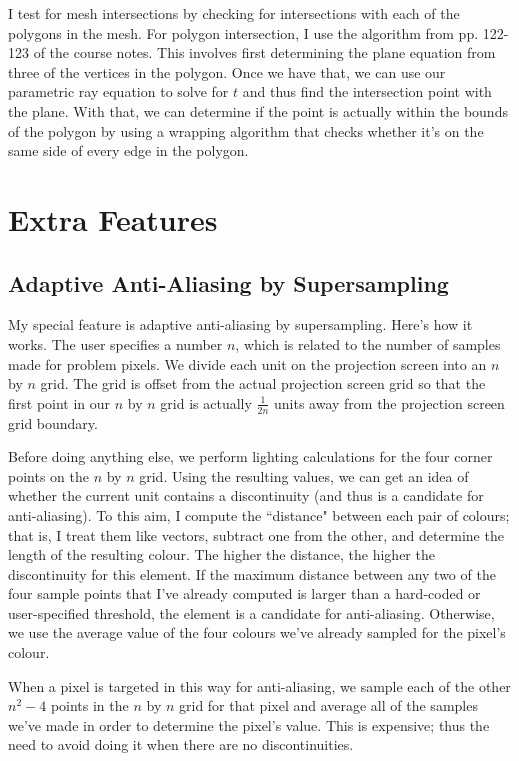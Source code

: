 \documentclass{article}
\begin{document}
I test for mesh intersections by checking for intersections with each of the
polygons in the mesh. For polygon intersection, I use the algorithm from pp. 122-123 of the
course notes. This involves first determining the plane equation from three of
the vertices in the polygon. Once we have that, we can use our parametric ray
equation to solve for $t$ and thus find the intersection point with the plane.
With that, we can determine if the point is actually within the bounds of the
polygon by using a wrapping algorithm that checks whether it's on the same side
of every edge in the polygon.

\section{Extra Features}

\subsection{Adaptive Anti-Aliasing by Supersampling}

My special feature is adaptive anti-aliasing by supersampling. Here's how it
works. The user specifies a number $n$, which is related to the number of
samples made for problem pixels. We divide each unit on the projection screen
into an $n$ by $n$ grid. The grid is offset from the actual projection screen grid so that the
first point in our $n$ by $n$ grid is actually $\frac{1}{2n}$ units away from
the projection screen grid boundary.

Before doing anything else, we perform lighting calculations for the four corner
points on the $n$ by $n$ grid. Using the resulting values, we can get an idea of
whether the current unit contains a discontinuity (and thus is a candidate for
anti-aliasing). To this aim, I compute the ``distance" between each pair of
colours; that is, I treat them like vectors, subtract one from the other, and
determine the length of the resulting colour. The higher the distance, the
higher the discontinuity for this element. If the maximum distance between any
two of the four sample points that I've already computed is larger than a
hard-coded or user-specified threshold, the element is a candidate for
anti-aliasing. Otherwise, we use the average value of the four colours we've
already sampled for the pixel's colour.

When a pixel is targeted in this way for anti-aliasing, we sample each of the
other $n^2 - 4$ points in the $n$ by $n$ grid for that pixel and average all of
the samples we've made in order to determine the pixel's value. This is
expensive; thus the need to avoid doing it when there are no discontinuities.
\end{document}
